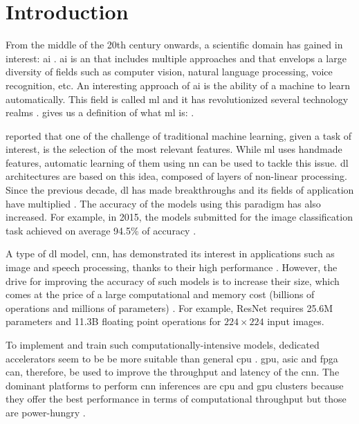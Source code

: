 \chapter{Introduction} \label{chap:intr}
%
%
From the middle of the 20th century onwards, a scientific domain has gained in interest: \acrfull{ai} \cite{russell_artificial_2009}. \acrshort{ai} is an  that includes multiple approaches and that envelops a large diversity of fields such as computer vision, natural language processing, voice recognition, etc.
An interesting approach of \acrshort{ai} is the ability of a machine to learn automatically. This field is called \acrfull{ml} and it has revolutionized several technology realms \cite{alom_history_2018}.
\textcite{mitchell_machine_1997} gives us a definition of what \acrshort{ml} is: .

\textcite{arnold_introduction_2011} reported that one of the challenge of traditional machine learning, given a task of interest, is the selection of the most relevant features. While \acrshort{ml} uses handmade features, automatic learning of them using \acrfull{nn} can be used to tackle this issue. \acrfull{dl} architectures are based on this idea, composed of layers of non-linear processing. Since the previous decade, \acrshort{dl} has made breakthroughs and its fields of application have multiplied \cite{wason_deep_2018}. The accuracy of the models using this paradigm has also increased. For example, in 2015, the models submitted for the image classification task achieved on average 94.5\% of accuracy \cite{russakovsky_imagenet_2015}.

A type of \acrshort{dl} model, \acrfull{cnn}, has demonstrated its interest in applications such as image and speech processing, thanks to their high performance \cite{shawahna_fpga-based_2019}. However, the drive for improving the accuracy of such models is to increase their size, which comes at the price of a large computational and memory cost (billions of operations and millions of parameters) \cite{szegedy_going_2014, khan_survey_2020}. For example, ResNet \cite{he_deep_2015} requires 25.6M parameters and 11.3B floating point operations for $224 \times 224$ input images.

To implement and train such computationally-intensive models, dedicated accelerators seem to be be more suitable than general \acrfull{cpu} \cite{liu_fpga-based_2019}. \acrfull{gpu}, \acrfull{asic} and \acrfull{fpga} can, therefore, be used to improve the throughput and latency of the \acrshort{cnn}. The dominant platforms to perform \acrshort{cnn} inferences are \acrshort{cpu} and \acrshort{gpu} clusters because they offer the best performance in terms of computational throughput but those are power-hungry \cite{liu_uniform_2019}.

